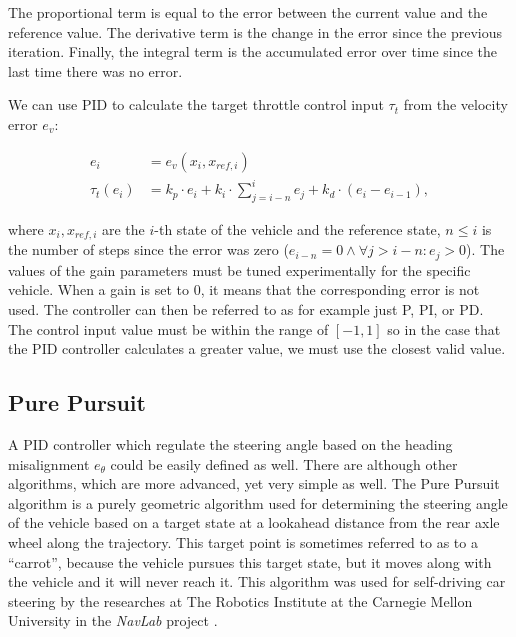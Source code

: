 The proportional term is equal to the error between the current value and the reference value. The derivative term is the change in the error since the previous iteration. Finally, the integral term is the accumulated error over time since the last time there was no error.

We can use \gls*{PID} to calculate the target throttle control input $\tau_t$ from the velocity error $e_v$:

\begin{align*}
	e_i&=e_v(x_i, x_{ref,i}) \\
	\tau_t(e_i)&=k_p \cdot e_i+k_i\cdot\sum_{j=i-n}^{i}e_j + k_d\cdot \left(e_i - e_{i-1}\right),
\end{align*}

where $x_i, x_{ref, i}$ are the  $i$-th state of the vehicle and the reference state, $n\leq i$ is the number of steps since the error was zero ($e_{i-n}=0\land \forall j>i-n: e_j>0$). The values of the gain parameters must be tuned experimentally for the specific vehicle. When a gain is set to $0$, it means that the corresponding error is not used. The controller can then be referred to as for example just P, PI, or PD. The control input value must be within the range of $\left[-1, 1\right]$ so in the case that the \gls*{PID} controller calculates a greater value, we must use the closest valid value. 

\subsection{Pure Pursuit}

A \gls*{PID} controller which regulate the steering angle based on the heading misalignment $e_\theta$ could be easily defined as well. There are although other algorithms, which are more advanced, yet very simple as well. The Pure Pursuit algorithm is a purely geometric algorithm used for determining the steering angle of the vehicle based on a target state at a lookahead distance from the rear axle wheel along the trajectory. This target point is sometimes referred to as to a ``carrot'', because the vehicle pursues this target state, but it moves along with the vehicle and it will never reach it. This algorithm was used for self-driving car steering by the researches at The Robotics Institute at the Carnegie Mellon University in the \textit{NavLab} project \cite{Pure_pursuit}.

